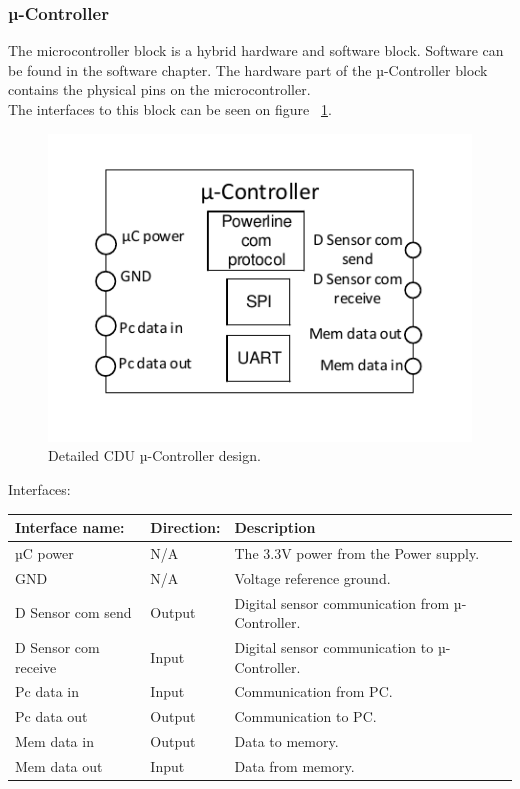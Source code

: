 \subsubsection{µ-Controller}
The microcontroller block is a hybrid hardware and software block. Software can be found in the software chapter. The hardware part of the µ-Controller block contains the physical pins on the microcontroller.\\
The interfaces to this block can be seen on figure ~\ref{fig:CDUuC}.\\
\begin{figure}[H]
	\centering
	\includegraphics[scale=1]{billeder/CDUuC}
	\caption{Detailed CDU µ-Controller design.}
	\label{fig:CDUuC}
\end{figure}
Interfaces:
\begin{table}[H]
	\centering
	\begin{tabular}{|p{3cm} |p{3cm}| p{8cm}| }
		\hline
		Interface name: & Direction: 	& Description \\ \hline
		µC power	  &N/A & The 3.3V power from the Power supply. \\ \hline
		GND				&N/A & Voltage reference ground. \\\hline 
		D Sensor com send & Output	& Digital sensor communication from µ-Controller. \\\hline 
		D Sensor com receive & Input	& Digital sensor communication to µ-Controller. \\\hline
		Pc data in		&Input & Communication from PC. \\\hline 
		Pc data out		&Output & Communication to PC. \\\hline
		Mem data in		&Output & Data to memory. \\\hline 
		Mem data out	&Input & Data from memory. \\\hline  
	\end{tabular}
\end{table}


